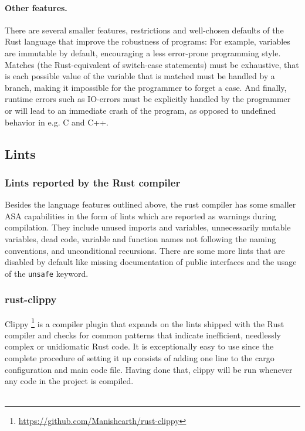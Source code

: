\documentclass{scrartcl}
\begin{document}
\paragraph{Other features.} There are several smaller features, restrictions and well-chosen defaults of the Rust language that improve the robustness of programs: For example, variables are immutable by default, encouraging a less error-prone programming style. Matches (the Rust-equivalent of switch-case statements) must be exhaustive, that is each possible value of the variable that is matched must be handled by a branch, making it impossible for the programmer to forget a case. And finally, runtime errors such as IO-errors must be explicitly handled by the programmer or will lead to an immediate crash of the program, as opposed to undefined behavior in e.g. C and C++.





\subsection{Lints}


\subsubsection{Lints reported by the Rust compiler}

Besides the language features outlined above, the rust compiler has some smaller ASA capabilities in the form of lints which are reported as warnings during compilation. They include unused imports and variables, unnecessarily mutable variables, dead code, variable and function names not following the naming conventions, and unconditional recursions. There are some more lints that are disabled by default like missing documentation of public interfaces and the usage of the \texttt{unsafe} keyword.

\subsubsection{rust-clippy} \label{clippy}

Clippy \footnote{\url{https://github.com/Manishearth/rust-clippy}} is a compiler plugin that expands on the lints shipped with the Rust compiler and checks for common patterns that indicate inefficient, needlessly complex or unidiomatic Rust code. It is exceptionally easy to use since the complete procedure of setting it up consists of adding one line to the cargo configuration and main code file. Having done that, clippy will be run whenever any code in the project is compiled.\\
\\
\end{document}

